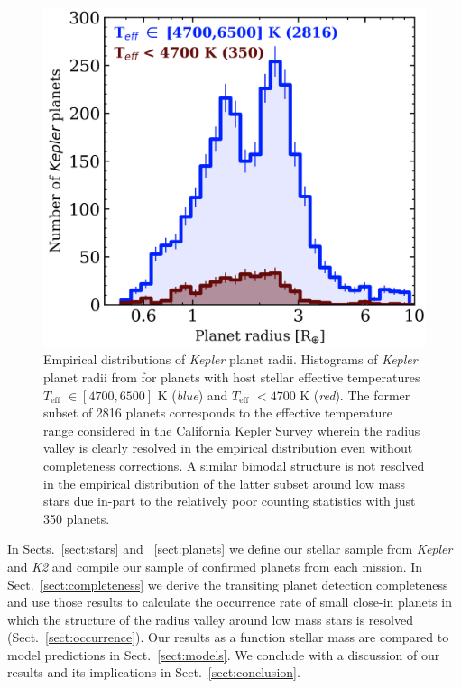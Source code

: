 \documentclass[twocolumn]{emulateapj}
\newcommand{\kepler}[1]{\emph{Kepler}#1}
\newcommand{\ktwo}[1]{\emph{K2}#1}
\newcommand{\teff}[1]{$T_{\text{eff}}$#1}
\begin{document}
\begin{figure}
  \centering
  \includegraphics[width=0.98\hsize]{figures/Bergerplanethist.png}
  \caption{Empirical distributions of \kepler{} planet radii. Histograms of \kepler{} planet radii
    from \cite{berger18} for planets with host stellar effective temperatures \teff{} $\in [4700,6500]$ K
    (\emph{blue}) and \teff{} $<4700$ K (\emph{red}). The former subset of 2816 planets corresponds to the
    effective temperature range considered in the California Kepler Survey \citep[CKS;][]{fulton17}
    wherein the radius valley is clearly
    resolved in the empirical distribution even without completeness corrections. A similar bimodal
    structure is not resolved in the empirical distribution of the latter subset around low mass stars
    due in-part to the relatively poor counting statistics with just 350 planets.}
  \label{fig:berger}
\end{figure}


In Sects.~\ref{sect:stars} and ~\ref{sect:planets} we define our stellar sample from \kepler{} and \ktwo{}
and compile our sample of confirmed planets from each mission.
In Sect.~\ref{sect:completeness} we derive the transiting planet detection completeness and use those results
to calculate the occurrence rate of small close-in planets in which the structure of the radius valley around
low mass stars is resolved (Sect.~\ref{sect:occurrence}). Our results as a function stellar mass are compared to
model predictions in Sect.~\ref{sect:models}. We conclude 
with a discussion of our results and its implications in Sect.~\ref{sect:conclusion}.
\end{document}
